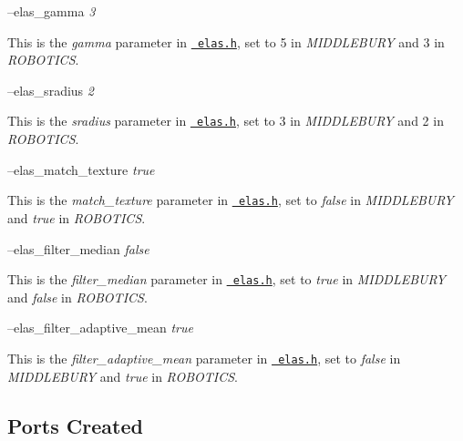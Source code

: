 --elas\+\_\+gamma {\itshape 3} 
\begin{DoxyItemize}
\item This is the {\itshape gamma} parameter in \href{https://github.com/robotology/stereo-vision/tree/master/lib/elas/include/elas.h}{\texttt{ elas.\+h}}, set to 5 in {\itshape M\+I\+D\+D\+L\+E\+B\+U\+RY} and 3 in {\itshape R\+O\+B\+O\+T\+I\+CS}.
\end{DoxyItemize}

--elas\+\_\+sradius {\itshape 2} 
\begin{DoxyItemize}
\item This is the {\itshape sradius} parameter in \href{https://github.com/robotology/stereo-vision/tree/master/lib/elas/include/elas.h}{\texttt{ elas.\+h}}, set to 3 in {\itshape M\+I\+D\+D\+L\+E\+B\+U\+RY} and 2 in {\itshape R\+O\+B\+O\+T\+I\+CS}.
\end{DoxyItemize}

--elas\+\_\+match\+\_\+texture {\itshape true} 
\begin{DoxyItemize}
\item This is the {\itshape match\+\_\+texture} parameter in \href{https://github.com/robotology/stereo-vision/tree/master/lib/elas/include/elas.h}{\texttt{ elas.\+h}}, set to {\itshape false} in {\itshape M\+I\+D\+D\+L\+E\+B\+U\+RY} and {\itshape true} in {\itshape R\+O\+B\+O\+T\+I\+CS}.
\end{DoxyItemize}

--elas\+\_\+filter\+\_\+median {\itshape false} 
\begin{DoxyItemize}
\item This is the {\itshape filter\+\_\+median} parameter in \href{https://github.com/robotology/stereo-vision/tree/master/lib/elas/include/elas.h}{\texttt{ elas.\+h}}, set to {\itshape true} in {\itshape M\+I\+D\+D\+L\+E\+B\+U\+RY} and {\itshape false} in {\itshape R\+O\+B\+O\+T\+I\+CS}.
\end{DoxyItemize}

--elas\+\_\+filter\+\_\+adaptive\+\_\+mean {\itshape true} 
\begin{DoxyItemize}
\item This is the {\itshape filter\+\_\+adaptive\+\_\+mean} parameter in \href{https://github.com/robotology/stereo-vision/tree/master/lib/elas/include/elas.h}{\texttt{ elas.\+h}}, set to {\itshape false} in {\itshape M\+I\+D\+D\+L\+E\+B\+U\+RY} and {\itshape true} in {\itshape R\+O\+B\+O\+T\+I\+CS}.
\end{DoxyItemize}\hypertarget{group__SFM_portsc_sec}{}\subsection{Ports Created}\label{group__SFM_portsc_sec}

